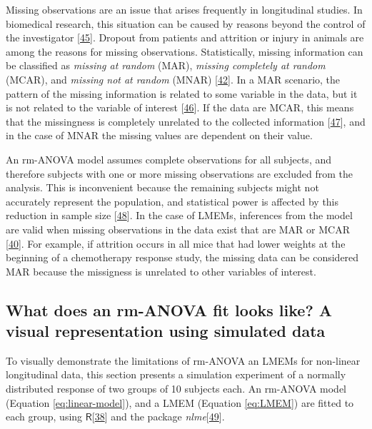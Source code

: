 \documentclass[
]{article}
\begin{document}
Missing observations are an issue that arises frequently in longitudinal studies. In biomedical research, this situation can be caused by reasons beyond the control of the investigator {[}\protect\hyperlink{ref-molenberghs2004}{45}{]}. Dropout from patients and attrition or injury in animals are among the reasons for missing observations. Statistically, missing information can be classified as \emph{missing at random} (MAR), \emph{missing completely at random} (MCAR), and \emph{missing not at random} (MNAR) {[}\protect\hyperlink{ref-weiss2005}{42}{]}. In a MAR scenario, the pattern of the missing information is related to some variable in the data, but it is not related to the variable of interest {[}\protect\hyperlink{ref-scheffer2002}{46}{]}. If the data are MCAR, this means that the missingness is completely unrelated to the collected information {[}\protect\hyperlink{ref-potthoff2006}{47}{]}, and in the case of MNAR the missing values are dependent on their value.

An rm-ANOVA model assumes complete observations for all subjects, and therefore subjects with one or more missing observations are excluded from the analysis. This is inconvenient because the remaining subjects might not accurately represent the population, and statistical power is affected by this reduction in sample size {[}\protect\hyperlink{ref-ma2012}{48}{]}. In the case of LMEMs, inferences from the model are valid when missing observations in the data exist that are MAR or MCAR {[}\protect\hyperlink{ref-west2014}{40}{]}. For example, if attrition occurs in all mice that had lower weights at the beginning of a chemotherapy response study, the missing data can be considered MAR because the missigness is unrelated to other variables of interest.

\hypertarget{simulation}{%
\subsection{What does an rm-ANOVA fit looks like? A visual representation using simulated data}\label{simulation}}

To visually demonstrate the limitations of rm-ANOVA an LMEMs for non-linear longitudinal data, this section presents a simulation experiment of a normally distributed response of two groups of 10 subjects each. An rm-ANOVA model (Equation \eqref{eq:linear-model}), and a LMEM (Equation \eqref{eq:LMEM}) are fitted to each group, using \(\textsf{R}\){[}\protect\hyperlink{ref-r}{38}{]} and the package \emph{nlme}{[}\protect\hyperlink{ref-nlme}{49}{]}.
\end{document}

